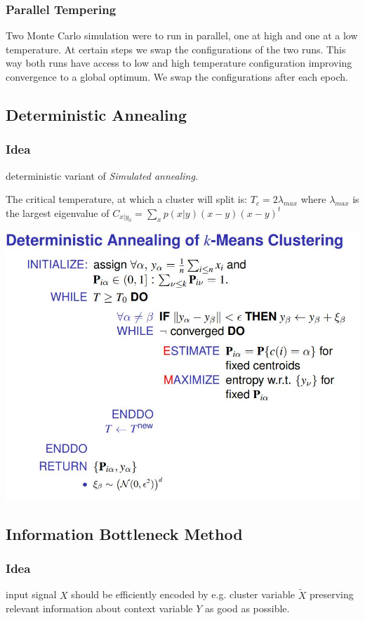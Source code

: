 \documentclass[9pt,parskip]{scrartcl}
\begin{document}
\begin{multicols*}{4}
\subsubsection*{Parallel Tempering}
Two Monte Carlo simulation were to run in parallel, one at high and one at a low temperature. At certain steps we swap the configurations of the two runs. This way both runs have access to low and high temperature configuration improving convergence to a global optimum. We swap the configurations after each epoch.
\subsection*{Deterministic Annealing}
\subsubsection*{Idea}
deterministic variant of \textit{Simulated annealing}.


The critical temperature, at which a cluster will split is:
$T_c = 2\lambda_{max}$ where $\lambda_{max}$ is the largest eigenvalue of $C_{x|y_0} = \sum_x p(x|y)(x-y)(x-y)^t$

\begin{center}
\includegraphics[width=0.9\linewidth]{pictures/deterministicAnnealing.jpg}

\end{center}

\subsection*{Information Bottleneck Method}
\subsubsection*{Idea}
input signal $X$ should be efficiently encoded by e.g. cluster variable $\tilde{X}$ preserving relevant information about context variable $Y$ as good as possible.


\end{multicols*}
\end{document}
